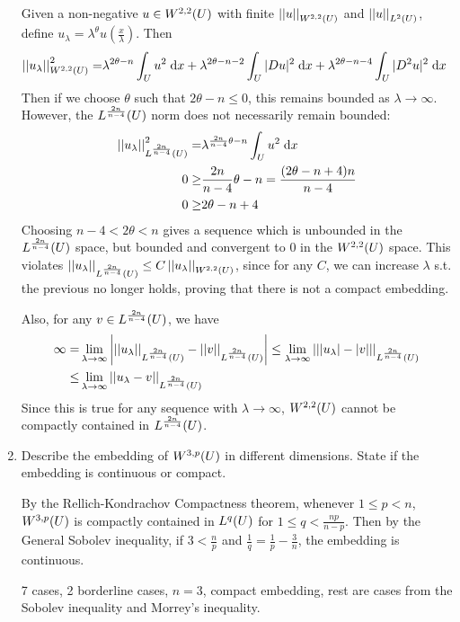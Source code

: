 \begin{enumerate}
  Given a non-negative $u \in W^{2, 2}(U)$ with finite $\left|\left|u\right|\right|_{W^{2, 2}(U)}$ and $\left|\left|u\right|\right|_{L^{2}(U)}$,
  define $u_\lambda = \lambda^\theta u(\frac{x}{\lambda})$.
  Then
  \begin{align*}
    \left|\left|u_\lambda\right|\right|_{W^{2, 2}(U)}^2 = &\lambda^{2 \theta - n} \int_U u^2 \;\mathrm{d}x
                                + \lambda^{2 \theta - n - 2} \int_U |D u|^2 \;\mathrm{d}x
                                + \lambda^{2 \theta - n - 4} \int_U |D^2 u|^2 \;\mathrm{d}x
  \end{align*}
  Then if we choose $\theta$ such that $2 \theta - n \leq 0$, this remains bounded as $\lambda \rightarrow \infty$.
  However, the $L^{\frac{2 n}{n - 4}}(U)$ norm does not necessarily remain bounded:
  \begin{align*}
    \left|\left|u_\lambda\right|\right|_{L^{\frac{2 n}{n - 4}}(U)}^2 = &\lambda^{\frac{2 n}{n - 4} \theta - n} \int_U u^2 \;\mathrm{d}x\\
    0 \geq &\frac{2 n}{n - 4} \theta - n = \frac{(2 \theta - n + 4) n}{n - 4}\\
    0 \geq &2 \theta - n + 4
  \end{align*}
  Choosing $n - 4 < 2 \theta < n$ gives a sequence which is unbounded in the $L^{\frac{2 n}{n - 4}}(U)$ space,
  but bounded and convergent to $0$ in  the $W^{2, 2}(U)$ space.
  This violates $\left|\left|u_\lambda\right|\right|_{L^{\frac{2 n}{n - 4}}(U)} \leq C \left|\left|u_\lambda\right|\right|_{W^{2, 2}(U)}$,
  since for any $C$, we can increase $\lambda$ s.t. the previous no longer holds,
  proving that there is not a compact embedding.

  Also, for any $v \in L^{\frac{2 n}{n - 4}}(U)$, we have
  \begin{align*}
    \infty = &\lim \limits_{\lambda \rightarrow \infty} \left| \left|\left|u_\lambda\right|\right|_{L^{\frac{2 n}{n - 4}}(U)}
                                               - \left|\left|v\right|\right|_{L^{\frac{2 n}{n - 4}}(U)} \right|
        \leq \lim \limits_{\lambda \rightarrow \infty} \left|\left||u_\lambda| - |v|\right|\right|_{L^{\frac{2 n}{n - 4}}(U)}\\
        \leq &\lim \limits_{\lambda \rightarrow \infty} \left|\left|u_\lambda - v\right|\right|_{L^{\frac{2 n}{n - 4}}(U)}
  \end{align*}
  Since this is true for any sequence with $\lambda \rightarrow \infty$,
  $W^{2, 2}(U)$ cannot be compactly contained in $L^{\frac{2 n}{n - 4}}(U)$.
\item Describe the embedding of $W^{3, p}(U)$ in different dimensions.
  State if the embedding is continuous or compact.

  By the Rellich-Kondrachov Compactness theorem, whenever $1 \leq p < n$,
  $W^{3, p}(U)$ is compactly contained in $L^{q}(U)$ for $1 \leq q < \frac{n p}{n - p}$.
  Then by the General Sobolev inequality, if $3 < \frac{n}{p}$ and $\frac{1}{q} = \frac{1}{p} - \frac{3}{n}$,
  the embedding is continuous.

  7 cases, 2 borderline cases, $n = 3$, compact embedding, rest are cases from the Sobolev inequality
  and Morrey's inequality.

\end{enumerate}
